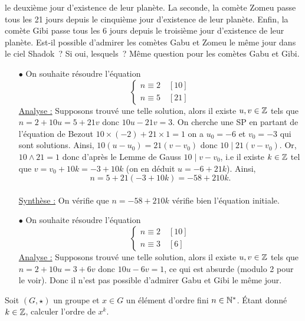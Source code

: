\documentclass{magnolia}
\begin{document}
\begin{exos}
  le deuxième jour d'existence de leur planète. La seconde, la comète Zomeu
  passe tous les 21 jours depuis le cinquième jour d'existence de leur planète.
  Enfin, la comète Gibi passe tous les 6 jours depuis le troisième jour
  d'existence de leur planète. Est-il possible d'admirer les comètes Gabu et
  Zomeu le même jour dans le ciel Shadok~? Si oui, lesquels~? Même question
  pour les comètes Gabu et Gibi.
  \begin{sol}
  \begin{itemize}
  \item[$\bullet$]
  On souhaite résoudre l'équation 
  $$\begin{cases}n\equiv 2\quad [10]\\
  n\equiv 5\quad [21]\end{cases}$$
  \underline{Analyse :}
  Supposons trouvé une telle solution, alors il existe $u,v \in \mathbb{Z}$ tels que $n=2+10u=5+21v$ donc $10u-21v=3$. On cherche une SP en partant de l'équation de Bezout $10\times (-2)+21\times 1=1$ on a $u_0=-6$ et $v_0=-3$ qui sont solutions. Ainsi, $10(u-u_0)=21(v-v_0)$ donc $10 \mid 21(v-v_0)$. Or, $10\wedge 21=1$ donc d'après le Lemme de Gauss $10\mid v-v_0$, i.e il existe $k\in \mathbb{Z}$ tel que $v=v_0+10k=-3+10k$ (on en déduit $u=-6+21k$). Ainsi,
  $$n=5+21(-3+10k)=-58+210k.$$\\
  \underline{Synthèse :} On vérifie que $n=-58+210k$ vérifie bien l'équation initiale.
  \item[$\bullet$]On souhaite résoudre l'équation 
  $$\begin{cases}n\equiv 2\quad [10]\\
  n\equiv 3\quad [6]\end{cases}$$
  \underline{Analyse :}
  Supposons trouvé une telle solution, alors il existe $u,v \in \mathbb{Z}$ tels que $n=2+10u=3+6v$ donc $10u-6v=1$, ce qui est absurde (modulo 2 pour le voir). Donc il n'est pas possible d'admirer Gabu et Gibi le même jour. 
  \end{itemize}
  \end{sol}
\exo Soit $(G,\star)$ un groupe et $x\in G$ un élément d'ordre fini $n\in{\mathbb{N}^*}$.
    Étant donné $k\in\mathbb{Z}$, calculer l'ordre de $x^k$.
    
    
\end{exos}
\end{document}
